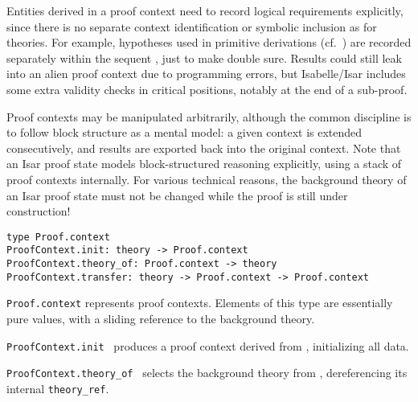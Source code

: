 \begin{isabellebody}
\begin{isamarkuptext}
  Entities derived in a proof context need to record logical
  requirements explicitly, since there is no separate context
  identification or symbolic inclusion as for theories.  For example,
  hypotheses used in primitive derivations (cf.\ )
  are recorded separately within the sequent \isa{{\isasymGamma}\ {\isasymturnstile}\ {\isasymphi}}, just to
  make double sure.  Results could still leak into an alien proof
  context due to programming errors, but Isabelle/Isar includes some
  extra validity checks in critical positions, notably at the end of a
  sub-proof.

  Proof contexts may be manipulated arbitrarily, although the common
  discipline is to follow block structure as a mental model: a given
  context is extended consecutively, and results are exported back
  into the original context.  Note that an Isar proof state models
  block-structured reasoning explicitly, using a stack of proof
  contexts internally.  For various technical reasons, the background
  theory of an Isar proof state must not be changed while the proof is
  still under construction!%
\end{isamarkuptext}%
\isamarkuptrue%
%
\isadelimmlref
%
\endisadelimmlref
%
\isatagmlref
%
\begin{isamarkuptext}%
\begin{mldecls}
  \verb|type Proof.context| \\
  \verb|ProofContext.init: theory -> Proof.context| \\
  \verb|ProofContext.theory_of: Proof.context -> theory| \\
  \verb|ProofContext.transfer: theory -> Proof.context -> Proof.context| \\
  \end{mldecls}

  \begin{description}

  \item \verb|Proof.context| represents proof contexts.  Elements
  of this type are essentially pure values, with a sliding reference
  to the background theory.

  \item \verb|ProofContext.init|~ produces a proof context
  derived from , initializing all data.

  \item \verb|ProofContext.theory_of|~ selects the
  background theory from , dereferencing its internal
  \verb|theory_ref|.


\end{description}
\end{isamarkuptext}
\end{isabellebody}
